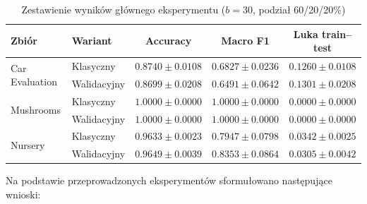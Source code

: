 \documentclass[12pt,a4paper]{article}
\begin{document}
\begin{table}[H]
\centering
\caption{Zestawienie wyników głównego eksperymentu ($b=30$, podział 60/20/20\%)}
\begin{tabular}{llccc}
\toprule
Zbiór & Wariant & Accuracy & Macro F1 & Luka train--test \\
\midrule
\multirow{2}{*}{Car Evaluation}
  & Klasyczny   & $0.8740 \pm 0.0108$ & $0.6827 \pm 0.0236$ & $0.1260 \pm 0.0108$ \\
  & Walidacyjny & $0.8699 \pm 0.0208$ & $0.6491 \pm 0.0642$ & $0.1301 \pm 0.0208$ \\
\midrule
\multirow{2}{*}{Mushrooms}
  & Klasyczny   & $1.0000 \pm 0.0000$ & $1.0000 \pm 0.0000$ & $0.0000 \pm 0.0000$ \\
  & Walidacyjny & $1.0000 \pm 0.0000$ & $1.0000 \pm 0.0000$ & $0.0000 \pm 0.0000$ \\
\midrule
\multirow{2}{*}{Nursery}
  & Klasyczny   & $0.9633 \pm 0.0023$ & $0.7947 \pm 0.0798$ & $0.0342 \pm 0.0025$ \\
  & Walidacyjny & $0.9649 \pm 0.0039$ & $0.8353 \pm 0.0864$ & $0.0305 \pm 0.0042$ \\
\bottomrule
\end{tabular}
\end{table}

Na podstawie przeprowadzonych eksperymentów sformułowano następujące wnioski:
\end{document}
